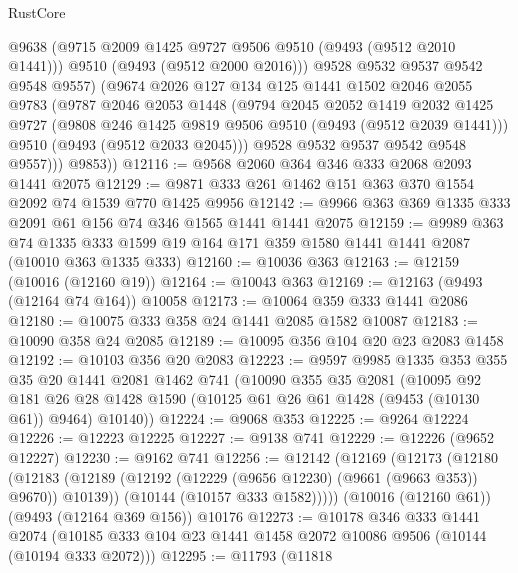 \begin{lexlean}{RustCore}
\begin{coremodule}
              @9638
              (@9715 @2009 @1425 @9727 @9506 @9510 (@9493 (@9512 @2010 @1441)))
              @9510
              (@9493 (@9512 @2000 @2016)))
            @9528
            @9532
            @9537
            @9542
            @9548
            @9557)
          (@9674
            @2026
            @127
            @134
            @125
            @1441
            @1502
            @2046
            @2055
            @9783
            (@9787
              @2046
              @2053
              @1448
              (@9794
                @2045
                @2052
                @1419
                @2032
                @1425
                @9727
                (@9808 @246 @1425 @9819 @9506 @9510 (@9493 (@9512 @2039 @1441)))
                @9510
                (@9493 (@9512 @2033 @2045)))
              @9528
              @9532
              @9537
              @9542
              @9548
              @9557)))
        @9853))
@12116 := @9568 @2060 @364 @346 @333 @2068 @2093 @1441 @2075
@12129 := @9871 @333 @261 @1462 @151 @363 @370 @1554 @2092 @74 @1539 @770 @1425 @9956
@12142 := @9966 @363 @369 @1335 @333 @2091 @61 @156 @74 @346 @1565 @1441 @1441 @2075
@12159 := @9989
    @363
    @74
    @1335
    @333
    @1599
    @19
    @164
    @171
    @359
    @1580
    @1441
    @1441
    @2087
    (@10010 @363 @1335 @333)
@12160 := @10036 @363
@12163 := @12159 (@10016 (@12160 @19))
@12164 := @10043 @363
@12169 := @12163 (@9493 (@12164 @74 @164)) @10058
@12173 := @10064 @359 @333 @1441 @2086
@12180 := @10075 @333 @358 @24 @1441 @2085 @1582 @10087
@12183 := @10090 @358 @24 @2085
@12189 := @10095 @356 @104 @20 @23 @2083 @1458
@12192 := @10103 @356 @20 @2083
@12223 := @9597
    @9985
    @1335
    @353
    @355
    @35
    @20
    @1441
    @2081
    @1462
    @741
    (@10090
      @355
      @35
      @2081
      (@10095
        @92
        @181
        @26
        @28
        @1428
        @1590
        (@10125 @61 @26 @61 @1428 (@9453 (@10130 @61)) @9464)
        @10140))
@12224 := @9068 @353
@12225 := @9264 @12224
@12226 := @12223 @12225
@12227 := @9138 @741
@12229 := @12226 (@9652 @12227)
@12230 := @9162 @741
@12256 := @12142
    (@12169
      (@12173
        (@12180
          (@12183 (@12189 (@12192 (@12229 (@9656 @12230) (@9661 (@9663 @353)) @9670)) @10139))
          (@10144 (@10157 @333 @1582)))))
    (@10016 (@12160 @61))
    (@9493 (@12164 @369 @156))
    @10176
@12273 := @10178
    @346
    @333
    @1441
    @2074
    (@10185 @333 @104 @23 @1441 @1458 @2072 @10086 @9506 (@10144 (@10194 @333 @2072)))
@12295 := @11793
    (@11818

\end{coremodule}
\end{lexlean}
